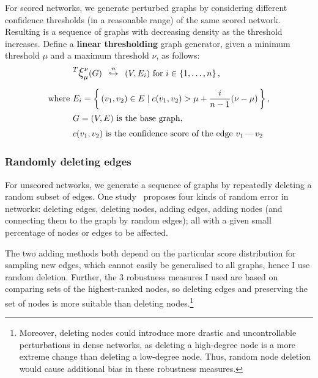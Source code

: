 For scored networks, we generate perturbed graphs by considering different confidence thresholds (in a reasonable range) of the same scored network.
Resulting is a sequence of graphs with decreasing density as the threshold increases.
Define a \textbf{linear thresholding} graph generator, given a minimum threshold $\mu$ and a maximum threshold $\nu$, as follows:
\begin{align}
    &\mathlarger{^T \mathlarger{\xi}}_{\mu}^{\nu}(G) \generates{n} (V, E_i)~\text{for}~i\in \integersto{n}, \\[6pt]
    \text{where}~& E_i = \Set{(v_1, v_2)\in E}{ c(v_1, v_2) > \mu + \frac{i}{n - 1}(\nu - \mu) }, \nonumber \\
    &G = (V, E)~\text{is the base graph}, \nonumber \\
    &c(v_1, v_2)~\text{is the confidence score of the edge $v_1\,\text{---}\,v_2$} \nonumber
\end{align}



\subsubsection*{Randomly deleting edges}\label{sec:randomly_removing_edges}

For unscored networks, we generate a sequence of graphs by repeatedly deleting a random subset of edges.
One study~\cite{BorgattiRobustnessCentralityMeasures2006} proposes four kinds of random error in networks: deleting edges, deleting nodes, adding edges, adding nodes (and connecting them to the graph by random edges); all with a given small percentage of nodes or edges to be affected.

The two adding methods both depend on the particular score distribution for sampling new edges, which cannot easily be generalised to all graphs, hence I use random deletion.
Further, the 3 robustness measures I used are based on comparing sets of the highest-ranked nodes, so deleting edges and preserving the set of nodes is more suitable than deleting nodes.\footnote{Moreover, deleting nodes could introduce more drastic and uncontrollable perturbations in dense networks, as deleting a high-degree node is a more extreme change than deleting a low-degree node. Thus, random node deletion would cause additional bias in these robustness measures.}

